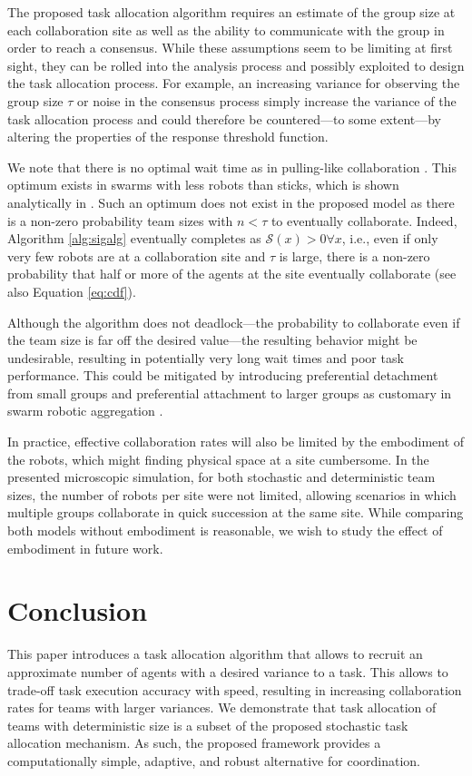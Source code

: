 \documentclass{TeXstyles/DARS/svmult}  %
\newcommand{\sig}{\mathcal{S}}
\begin{document}
The proposed task allocation algorithm requires an estimate of the group size at each collaboration site as well as the ability to communicate with the group in order to reach a consensus. While these assumptions seem to be limiting at first sight, they can be rolled into the analysis process and possibly exploited to design the task allocation process. For example, an increasing variance for observing the group size $\tau$ or noise in the consensus process simply increase the variance of the task allocation process and could therefore be countered---to some extent---by altering the properties of the response threshold function. 

We note that there is no optimal wait time as in pulling-like collaboration \cite{Lerman2001}. This optimum exists in swarms with less robots than sticks, which is shown analytically in \cite{Martinoli2004}. Such an optimum does not exist in the proposed model as there is a non-zero probability team sizes with $n<\tau$ to eventually collaborate. Indeed, Algorithm \ref{alg:sigalg} eventually completes as $\sig(x) > 0 \forall x$, i.e., even if only very few robots are at a collaboration site and $\tau$ is large, there is a non-zero probability that half or more of the agents at the site eventually collaborate (see also Equation \ref{eq:cdf}).

Although the algorithm does not deadlock---the probability to collaborate even if the team size is far off the desired value---the resulting behavior might be undesirable, resulting in potentially very long wait times and poor task performance. This could be mitigated by introducing preferential detachment from small groups and preferential attachment to larger groups as customary in swarm robotic aggregation \cite{correll2011modeling}.

In practice, effective collaboration rates will also be limited by the embodiment of the robots, which might finding physical space at a site cumbersome. In the presented microscopic simulation, for both stochastic and deterministic team sizes, the number of robots per site were not limited, allowing scenarios in which multiple groups collaborate in quick succession at the same site. While comparing both models without embodiment is reasonable, we wish to study the effect of embodiment in future work.

\section{Conclusion}\label{sec:conclusion}
This paper introduces a task allocation algorithm that allows to recruit an approximate number of agents with a desired variance to a task. This allows to trade-off task execution accuracy with speed, resulting in increasing collaboration rates for teams with larger variances. 
We demonstrate that task allocation of teams with deterministic size is a subset of the proposed stochastic task allocation mechanism. As such, the proposed framework provides a computationally simple, adaptive, and robust alternative for coordination.
\end{document}
